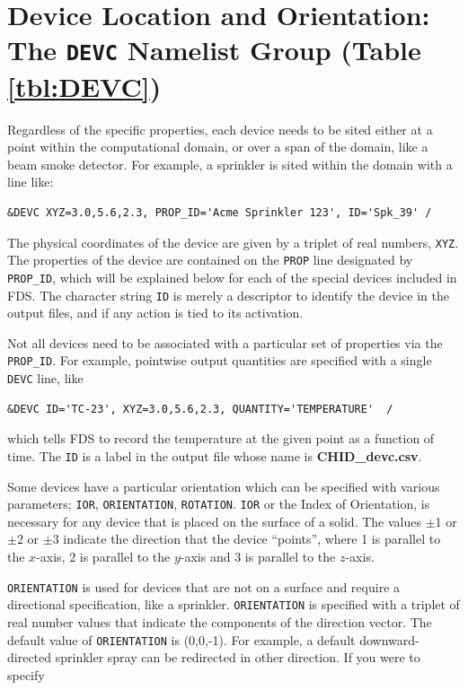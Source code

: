 \documentclass[11pt]{book}
\newcommand{\ct}{\tt\small}
\begin{document}
\section{Device Location and Orientation: The \texorpdfstring{{\tt DEVC}}{DEVC} Namelist Group (Table \ref{tbl:DEVC})}
\label{info:DEVC}

Regardless of the specific properties, each device needs to be sited either at a point within the computational domain, or
over a span of the domain, like a beam smoke detector. For example, a sprinkler is sited within the domain with a line like:

\footnotesize
\begin{verbatim}
&DEVC XYZ=3.0,5.6,2.3, PROP_ID='Acme Sprinkler 123', ID='Spk_39' /
\end{verbatim}
\normalsize

\noindent
The physical coordinates of the
device are given by a triplet of real numbers, {\ct XYZ}.
The properties of the device are contained on the {\ct PROP} line
designated by {\ct PROP\_ID}, which will be explained below for each of the
special devices included in FDS.
The character string {\ct ID} is merely a descriptor to identify the
device in the output files, and if any action is tied to its activation.

Not all devices need to be associated with a particular set of properties via the {\ct PROP\_ID}. For example, pointwise
output quantities are specified with a single {\ct DEVC} line, like

\footnotesize
\begin{verbatim}
&DEVC ID='TC-23', XYZ=3.0,5.6,2.3, QUANTITY='TEMPERATURE'  /
\end{verbatim}
\normalsize

\noindent
which tells FDS to record the temperature at the given point as a function of time. The {\ct ID} is a label in the output file whose name
is {\bf CHID\_devc.csv}.

Some devices have a particular orientation which can be specified
with various parameters; {\ct IOR}, {\ct ORIENTATION}, {\ct ROTATION}.
{\ct IOR} or the Index of Orientation, is necessary for any device that is
placed on the surface of a solid. The values $\pm$1 or $\pm$2 or $\pm$3 indicate the direction
that the device ``points'', where 1 is parallel to the $x$-axis, 2 is parallel to the $y$-axis
and 3 is parallel to the $z$-axis.

{\ct ORIENTATION} is used for devices that are not on a surface
and require a directional specification, like a sprinkler. {\ct ORIENTATION} is specified with a
triplet of real number values that indicate the components of the direction vector.
The default value of {\ct ORIENTATION} is (0,0,-1).
For example, a default downward-directed sprinkler spray can be redirected in other direction.
If you were to specify
\end{document}
